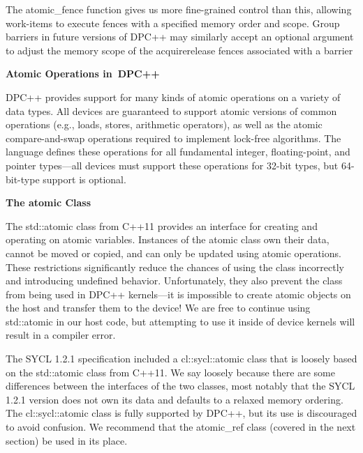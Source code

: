 The atomic\_fence function gives us more fine-grained control than this, allowing work-items to execute fences with a specified memory order and scope. Group barriers in future versions of DPC++ may similarly accept an optional argument to adjust the memory scope of the acquirerelease fences associated with a barrier\par

\hspace*{\fill} \par %
\textbf{Atomic Operations in DPC++}

DPC++ provides support for many kinds of atomic operations on a variety of data types. All devices are guaranteed to support atomic versions of common operations (e.g., loads, stores, arithmetic operators), as well as the atomic compare-and-swap operations required to implement lock-free algorithms. The language defines these operations for all fundamental integer, floating-point, and pointer types—all devices must support these operations for 32-bit types, but 64-bit-type support is optional.\par

\hspace*{\fill} \par %
\textbf{The atomic Class}

The std::atomic class from C++11 provides an interface for creating and operating on atomic variables. Instances of the atomic class own their data, cannot be moved or copied, and can only be updated using atomic operations. These restrictions significantly reduce the chances of using the class incorrectly and introducing undefined behavior. Unfortunately, they also prevent the class from being used in DPC++ kernels—it is impossible to create atomic objects on the host and transfer them to the device! We are free to continue using std::atomic in our host code, but attempting to use it inside of device kernels will result in a compiler error.\par

\begin{tcolorbox}[colback=blue!5!white,colframe=blue!75!black, title=ATOMIC CLASS DEPRECATED IN SYCL 2020 AND DPC++]
The SYCL 1.2.1 specification included a cl::sycl::atomic class that is loosely based on the std::atomic class from C++11. We say loosely because there are some differences between the interfaces of the two classes, most notably that the SYCL 1.2.1 version does not own its data and defaults to a relaxed memory ordering.\\

The cl::sycl::atomic class is fully supported by DPC++, but its use is discouraged to avoid confusion. We recommend that the atomic\_ref class (covered in the next section) be used in its place.
\end{tcolorbox}

